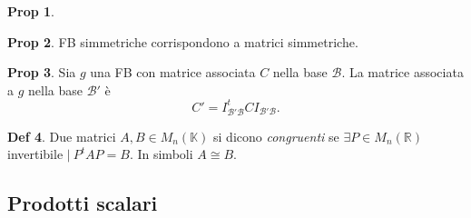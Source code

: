 \documentclass[]{article}
\theoremstyle{definition}
\theoremstyle{definition}
\newtheorem{prop}{Prop}[subsection]
\theoremstyle{definition}
\newtheorem{dfn}[prop]{Def}
\begin{document}
\begin{prop}
\end{prop} \begin{prop} FB simmetriche corrispondono a matrici simmetriche.

\end{prop} \begin{prop} Sia $g$ una FB con matrice associata $C$ nella base $\mathcal{B}$. La matrice associata a $g$ nella base $\mathcal{B'}$ è 
$$ C' = I_{\mathcal{B'} \mathcal{B}} ^t C I_{\mathcal{B'} \mathcal{B}}. $$

\end{prop} \begin{dfn} Due matrici $A,B \in M_n (\mathbb{K})$ si dicono \emph{congruenti} se $\exists P \in M_n (\mathbb{R})$ invertibile $| \ P^t AP =B$. In simboli $A \cong B$.
\end{dfn}

\subsection{Prodotti scalari} 
\end{document}
